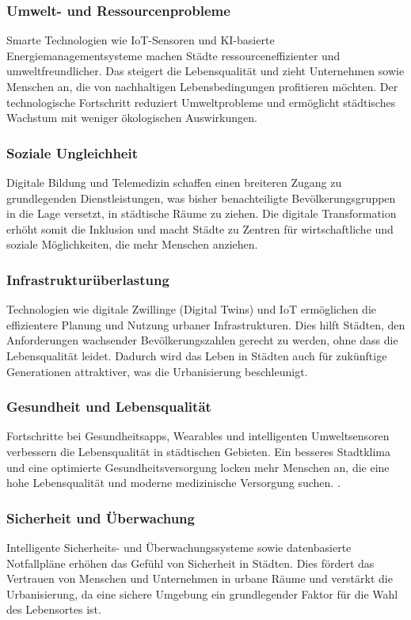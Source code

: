 \documentclass[conference,compsoc,final,a4paper, onecolumn, 11pt]{IEEEtran}
\begin{document}
\subsubsection{Umwelt- und Ressourcenprobleme}
Smarte Technologien wie \ac{IoT}-Sensoren und \ac{KI}-basierte Energiemanagementsysteme machen Städte ressourceneffizienter und umweltfreundlicher. 
Das steigert die Lebensqualität und zieht Unternehmen sowie Menschen an, die von nachhaltigen Lebensbedingungen profitieren möchten. 
Der technologische Fortschritt reduziert Umweltprobleme und ermöglicht städtisches Wachstum mit weniger ökologischen Auswirkungen. \autocite{sensors_smart_2015}

\subsubsection{Soziale Ungleichheit}
Digitale Bildung und Telemedizin schaffen einen breiteren Zugang zu grundlegenden Dienstleistungen, was bisher benachteiligte Bevölkerungsgruppen in die Lage versetzt, in städtische Räume zu ziehen. 
Die digitale Transformation erhöht somit die Inklusion und macht Städte zu Zentren für wirtschaftliche und soziale Möglichkeiten, die mehr Menschen anziehen. \autocite{digital_how_2024}

\subsubsection{Infrastrukturüberlastung}
Technologien wie digitale Zwillinge (Digital Twins) und \ac{IoT} ermöglichen die effizientere Planung und Nutzung urbaner Infrastrukturen. 
Dies hilft Städten, den Anforderungen wachsender Bevölkerungszahlen gerecht zu werden, ohne dass die Lebensqualität leidet. 
Dadurch wird das Leben in Städten auch für zukünftige Generationen attraktiver, was die Urbanisierung beschleunigt. \autocite{mckinsey_global_institute_smart_2021}

\subsubsection{Gesundheit und Lebensqualität}
Fortschritte bei Gesundheitsapps, Wearables und intelligenten Umweltsensoren verbessern die Lebensqualität in städtischen Gebieten. 
Ein besseres Stadtklima und eine optimierte Gesundheitsversorgung locken mehr Menschen an, die eine hohe Lebensqualität und moderne medizinische Versorgung suchen. \autocite{un_habitat_world_2022}.

\subsubsection{Sicherheit und Überwachung}
Intelligente Sicherheits- und Überwachungssysteme sowie datenbasierte Notfallpläne erhöhen das Gefühl von Sicherheit in Städten. 
Dies fördert das Vertrauen von Menschen und Unternehmen in urbane Räume und verstärkt die Urbanisierung, da eine sichere Umgebung ein grundlegender Faktor für die Wahl des Lebensortes ist. \autocite{mckinsey_global_institute_smart_2021}
\end{document}
